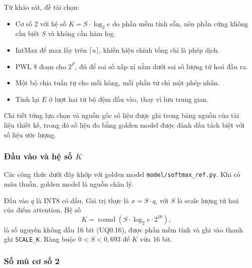Từ khảo sát, đề tài chọn:
\begin{itemize}
  \item Cơ số 2 với hệ số $K = S \cdot \log_2 e$ do phần mềm tính sẵn, nên phần cứng không cần biết $S$ và không cần hàm log.
  \item IntMax để max lấy trên $\lceil u \rceil$, khiến hiệu chỉnh tổng chỉ là phép dịch.
  \item PWL 8 đoạn cho $2^{F}$, đủ để sai số xấp xỉ nằm dưới sai số lượng tử hoá đầu ra.
  \item Một bộ chia tuần tự cho mỗi hàng, mỗi phần tử chỉ một phép nhân.
  \item Tính lại $E$ ở lượt hai từ bộ đệm đầu vào, thay vì lưu trung gian.
\end{itemize}

Chi tiết từng lựa chọn và nguồn gốc số liệu được ghi trong bảng nguồn của tài liệu thiết kế, trong đó số liệu đo bằng golden model được đánh dấu tách biệt với số liệu ước lượng.

\subsubsection{Đầu vào và hệ số $K$}
\label{sec:arith}

Các công thức dưới đây khớp với golden model \texttt{model/softmax\_ref.py}. Khi có mâu thuẫn, golden model là nguồn chân lý.

Đầu vào $q$ là INT8 có dấu. Giá trị thực là $x = S \cdot q$, với $S$ là scale lượng tử hoá của điểm attention. Hệ số
\begin{equation}
  K = \operatorname{round}(S \cdot \log_2 e \cdot 2^{16}),
\end{equation}
là số nguyên không dấu 16 bit (UQ0.16), được phần mềm tính và ghi vào thanh ghi \texttt{SCALE\_K}. Ràng buộc $0 < S < 0{,}693$ để $K$ vừa 16 bit.

\subsubsection{Số mũ cơ số 2}
\label{sec:exp}


